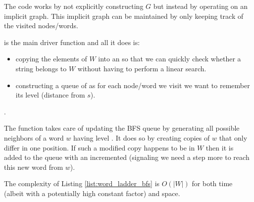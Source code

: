 

The code works by not explicitly constructing $G$ but instead by operating on an implicit graph. This implicit graph can be maintained by only keeping track of the visited nodes/words. 

 is the main driver function and all it does is:
\begin{itemize}
    \item copying the elements of $W$ into an  so that we can quickly check whether a string belongs to $W$ without having to perform a linear search.
    \item constructing a queue of  as for each node/word we visit we want to remember its level (distance from $s$).
\end{itemize}.

The function  takes care of updating the BFS queue by generating all possible neighbors of a word $w$ having level . 
It does so by creating copies of $w$ that only differ in one position. If such a modified copy happens to be in $W$ then it is added to the queue with an incremented  (signaling we need a step more to reach this new word from $w$).

The complexity of Listing \ref{list:word_ladder_bfs} is $O(|W|)$ for both time (albeit with a potentially high constant factor) and space.